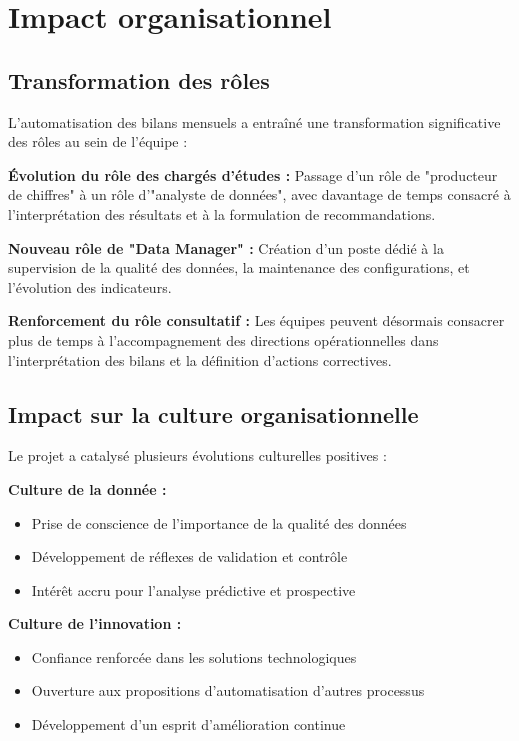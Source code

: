 \section{Impact organisationnel}

\subsection{Transformation des rôles}

L'automatisation des bilans mensuels a entraîné une transformation significative des rôles au sein de l'équipe :

\medskip

\textbf{Évolution du rôle des chargés d'études :}
Passage d'un rôle de "producteur de chiffres" à un rôle d'"analyste de données", avec davantage de temps consacré à l'interprétation des résultats et à la formulation de recommandations.

\textbf{Nouveau rôle de "Data Manager" :}
Création d'un poste dédié à la supervision de la qualité des données, la maintenance des configurations, et l'évolution des indicateurs.

\textbf{Renforcement du rôle consultatif :}
Les équipes peuvent désormais consacrer plus de temps à l'accompagnement des directions opérationnelles dans l'interprétation des bilans et la définition d'actions correctives.

\subsection{Impact sur la culture organisationnelle}

Le projet a catalysé plusieurs évolutions culturelles positives :

\medskip

\textbf{Culture de la donnée :}
\begin{itemize}
    \item Prise de conscience de l'importance de la qualité des données
    \item Développement de réflexes de validation et contrôle
    \item Intérêt accru pour l'analyse prédictive et prospective
\end{itemize}

\textbf{Culture de l'innovation :}
\begin{itemize}
    \item Confiance renforcée dans les solutions technologiques
    \item Ouverture aux propositions d'automatisation d'autres processus
    \item Développement d'un esprit d'amélioration continue
\end{itemize}

